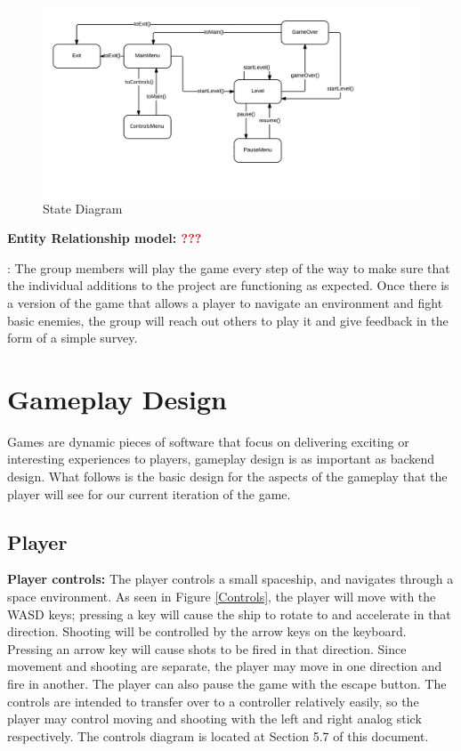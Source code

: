 \documentclass[12pt]{article}       %
\def\hs{\hspace{15pt}}
\begin{document}
\begin{figure} [H]
\centering
\includegraphics[width=7in]{PewPewStateDiagramFinal.png}
\caption{State Diagram} \label{StateDia}
\end{figure}

{\bf Entity Relationship model: \textcolor{red}{???}}

\hs {\bf Testing plans}: The group members will play the game every step of the way to make sure that the individual additions to the project are functioning as expected. Once there is a version of the game that allows a player to navigate an environment and fight basic enemies, the group will reach out others to play it and give feedback in the form of a simple survey. 

\section{Gameplay Design} %
\label{sec:GPdesign}

Games are dynamic pieces of software that focus on delivering exciting or interesting experiences to players, gameplay design is as important as backend design. What follows is the basic design for the aspects of the gameplay that the player will see for our current iteration of the game.

\subsection{Player} %

	{\bf Player controls: }The player controls a small spaceship, and navigates through a space environment. As seen in Figure \ref{Controls}, the player will move with the WASD keys; pressing a key will cause the ship to rotate to and accelerate in that direction.  Shooting will be controlled by the arrow keys on the keyboard. Pressing an arrow key will cause shots to be fired in that direction. Since movement and shooting are separate, the player may move in one direction and fire in another.  The player can also pause the game with the escape button. The controls are intended to transfer over to a controller relatively easily, so the player may control moving and shooting with the left and right analog stick respectively. The controls diagram is located at Section 5.7 of this document.
\end{document}
